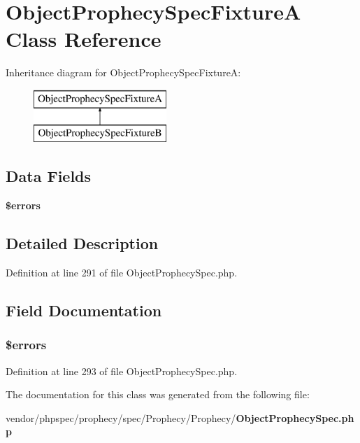\section{Object\+Prophecy\+Spec\+Fixture\+A Class Reference}
\label{classspec_1_1_prophecy_1_1_prophecy_1_1_object_prophecy_spec_fixture_a}
Inheritance diagram for Object\+Prophecy\+Spec\+Fixture\+A\+:\begin{figure}[H]
\begin{center}
\leavevmode
\includegraphics[height=2.000000cm]{classspec_1_1_prophecy_1_1_prophecy_1_1_object_prophecy_spec_fixture_a}
\end{center}
\end{figure}
\subsection*{Data Fields}
\begin{DoxyCompactItemize}
\item 
{\bf \$errors}
\end{DoxyCompactItemize}


\subsection{Detailed Description}


Definition at line 291 of file Object\+Prophecy\+Spec.\+php.



\subsection{Field Documentation}
\subsubsection[{\$errors}]{\setlength{\rightskip}{0pt plus 5cm}\$errors}\label{classspec_1_1_prophecy_1_1_prophecy_1_1_object_prophecy_spec_fixture_a_ab24faf4aa647cdcee494fc48524ad4ff}


Definition at line 293 of file Object\+Prophecy\+Spec.\+php.



The documentation for this class was generated from the following file\+:\begin{DoxyCompactItemize}
\item 
vendor/phpspec/prophecy/spec/\+Prophecy/\+Prophecy/{\bf Object\+Prophecy\+Spec.\+php}\end{DoxyCompactItemize}
